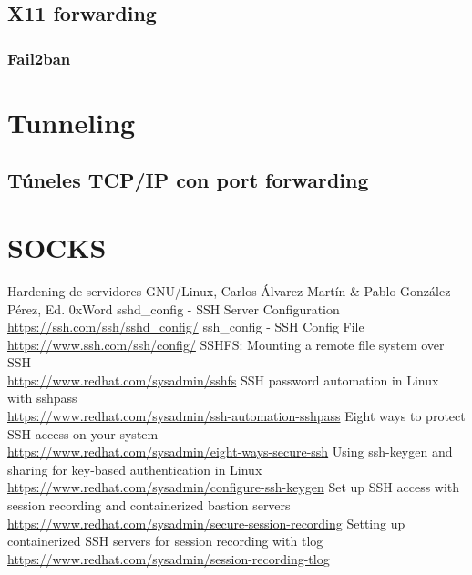 \documentclass[a4paper, 11pt, titlepage]{article}
\begin{document}
    \subsection{X11 forwarding}\label{X11Forwarding}
    \subsubsection{Fail2ban}
\section{Tunneling}
    \subsection{Túneles TCP/IP con port forwarding}
\section{SOCKS}

\newpage
\begin{thebibliography}{X}
    \bibitem{} Hardening de servidores GNU/Linux, Carlos Álvarez Martín \& Pablo González Pérez, Ed. 0xWord
    \bibitem{} sshd\_config - SSH Server Configuration \\ \url{https://ssh.com/ssh/sshd_config/}
    \bibitem{} ssh\_config - SSH Config File \\ \url{https://www.ssh.com/ssh/config/}
    \bibitem{} SSHFS: Mounting a remote file system over SSH \\ \url{https://www.redhat.com/sysadmin/sshfs}
    \bibitem{} SSH password automation in Linux with sshpass \\ \url{https://www.redhat.com/sysadmin/ssh-automation-sshpass}
    \bibitem{} Eight ways to protect SSH access on your system \\ \url{https://www.redhat.com/sysadmin/eight-ways-secure-ssh}
    \bibitem{} Using ssh-keygen and sharing for key-based authentication in Linux \\ \url{https://www.redhat.com/sysadmin/configure-ssh-keygen}
    \bibitem{} Set up SSH access with session recording and containerized bastion servers \\ \url{https://www.redhat.com/sysadmin/secure-session-recording}
    \bibitem{} Setting up containerized SSH servers for session recording with tlog \\ \url{https://www.redhat.com/sysadmin/session-recording-tlog}
\end{thebibliography}
\end{document}
